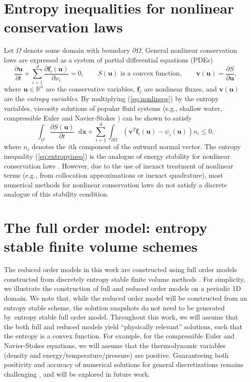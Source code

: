\documentclass[preprint,10pt]{elsarticle}
\theoremstyle{definition}
\theoremstyle{lemma}
\theoremstyle{theorem}
\theoremstyle{assumption}
\newcommand*\diff[1]{\mathop{}\!{\mathrm{d}#1}}
\newcommand{\pd}[2]{\frac{\partial#1}{\partial#2}}
\newcommand{\LRp}[1]{\left( #1 \right)}
\begin{document}
\section{Entropy inequalities for nonlinear conservation laws}
\label{sec:1}
Let $\Omega$ denote some domain with boundary $\partial \Omega$.  General nonlinear conservation laws are expressed as a system of partial differential equations (PDEs) 
\begin{equation}
\pd{\bm{u}}{t}  + \sum_{i=1}^d\pd{\bm{f}_i(\bm{u})}{x_i} = 0, \qquad 
S(\bm{u}) \text{ is a convex function}, \qquad
\bm{v}(\bm{u}) = \pd{S}{\bm{u}},
\label{eq:nonlineqs}
\end{equation}
where $\bm{u}\in \mathbb{R}^n$ are the conservative variables, $\bm{f}_j$ are nonlinear fluxes, and $\bm{v}(\bm{u})$ are the \textit{entropy variables}.  By multiplying (\ref{eq:nonlineqs}) by the entropy variables, viscosity solutions \cite{oleinik1957discontinuous, kruvzkov1970first}  of popular fluid systems (e.g., shallow water, compressible Euler and Navier-Stokes \cite{hughes1986new, chen2017entropy}) can be shown to satisfy 
\begin{equation}
\int_{\Omega}\pd{S(\bm{u})}{t}\diff{\bm{x}} + \sum_{i=1}^d \int_{\partial \Omega} \LRp{\bm{v}^T\bm{f}_i(\bm{u}) - \psi_i(\bm{u})}n_i \leq 0\label{eq:entropyineq},
\end{equation}
where $n_i$ denotes the $i$th component of the outward normal vector.  
The entropy inequality (\ref{eq:entropyineq}) is the analogue of energy stability for nonlinear conservation laws \cite{mock1980systems, harten1983symmetric}.  
However, due to the use of inexact treatment of nonlinear terms (e.g., from collocation approximations or inexact quadrature), most numerical methods for nonlinear conservation laws do not satisfy a discrete analogue of this stability condition. 

\section{The full order model: entropy stable finite volume schemes}
\label{sec:2}

The reduced order models in this work are constructed using full order models constructed from discretely entropy stable finite volume methods \cite{tadmor1987numerical}.  For simplicity, we illustrate the construction of full and reduced order models on a periodic 1D domain.  We note that, while the reduced order model will be constructed from an entropy stable scheme, the solution snapshots do not need to be generated by entropy stable full order model.  Throughout this work, we will assume that the both full and reduced models yield ``physically relevant'' solutions, such that the entropy is a convex function.  For example, for the compressible Euler and Navier-Stokes equations, we will assume that the thermodynamic variables (density and energy/temperature/pressure) are positive.  Guaranteeing both positivity and accuracy of numerical solutions for general discretizations remains challenging \cite{guermond2016invariant, guermond2019invariant}, and will be explored in future work.
\end{document}
